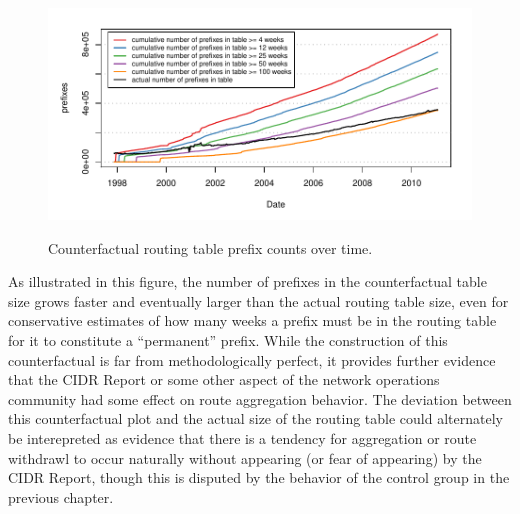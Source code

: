 \begin{figure}[h]
\begin{center}
    \includegraphics[width=6in]{figures/counterfactual.pdf}
    \vspace{-2em}\\
    \caption{Counterfactual routing table prefix counts over time.}
    \label{fig:counterfactual}
\end{center}
\end{figure}

As illustrated in this figure, the number of prefixes in the counterfactual
table size grows faster and eventually larger than the actual routing table
size, even for conservative estimates of how many weeks a prefix must be in the
routing table for it to constitute a ``permanent'' prefix. While the
construction of this counterfactual is far from methodologically perfect, it
provides further evidence that the CIDR Report or some other aspect of the
network operations community had some effect on route aggregation behavior. The
deviation between this counterfactual plot and the actual size of the routing
table could alternately be interepreted as evidence that there is a tendency
for aggregation or route withdrawl to occur naturally without appearing (or
fear of appearing) by the CIDR Report, though this is disputed by the behavior
of the control group in the previous chapter.

%
%
%
%

